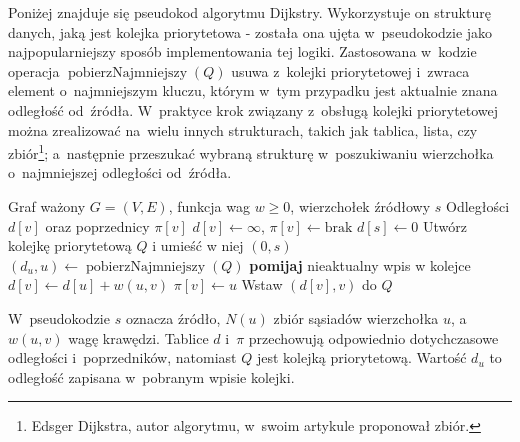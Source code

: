 \documentclass[11pt,a4paper,oneside]{report}
\begin{document}
Poniżej znajduje się pseudokod algorytmu Dijkstry. Wykorzystuje on strukturę danych, jaką jest kolejka priorytetowa - została ona ujęta w~pseudokodzie jako najpopularniejszy sposób implementowania tej logiki. Zastosowana w~kodzie operacja $\operatorname{pobierzNajmniejszy}(Q)$ usuwa z~kolejki priorytetowej i~zwraca element o~najmniejszym kluczu, którym w~tym przypadku jest aktualnie znana odległość od~źródła. W~praktyce krok związany z~obsługą kolejki priorytetowej można zrealizować na~wielu innych strukturach, takich jak tablica, lista, czy zbiór\footnote{Edsger Dijkstra, autor algorytmu, w~swoim artykule proponował zbiór\cite{dijkstra-1959-shortestpath}.}; a~następnie przeszukać wybraną strukturę w~poszukiwaniu wierzchołka o~najmniejszej odległości od~źródła.


\begin{algorithm}[H]
  \caption{Algorytm Dijkstry}
  \label{alg:dijkstra}
  \small
  \begin{algorithmic}[1]
    \Require Graf ważony $G=(V,E)$, funkcja wag $w\geq 0$, wierzchołek źródłowy $s$
    \Ensure Odległości $d[v]$ oraz poprzednicy $\pi[v]$
      \State $d[v]\gets\infty$, $\pi[v]\gets\text{brak}$
    \EndFor
    \State $d[s]\gets 0$
    \State Utwórz kolejkę priorytetową $Q$ i umieść w niej $(0,s)$
      \State $(d_u,u)\gets\operatorname{pobierzNajmniejszy}(Q)$
        \State \textbf{pomijaj} nieaktualny wpis w kolejce
      \Else
            \State $d[v]\gets d[u]+w(u,v)$
            \State $\pi[v]\gets u$
            \State Wstaw $(d[v],v)$ do $Q$
          \EndIf
        \EndFor
      \EndIf
    \EndWhile
    \State {}
  \end{algorithmic}
\end{algorithm}

W~pseudokodzie $s$ oznacza źródło, $N(u)$ zbiór sąsiadów wierzchołka $u$, a~$w(u,v)$ wagę krawędzi. Tablice $d$ i~$\pi$ przechowują odpowiednio dotychczasowe odległości i~poprzedników, natomiast $Q$ jest kolejką priorytetową. Wartość $d_u$ to odległość zapisana w~pobranym wpisie kolejki.
\end{document}
